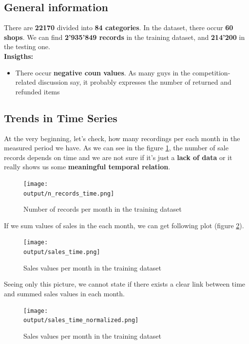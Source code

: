 \documentclass[12pt,twoside,a4paper]{memoir}
\def \output {../output}
\begin{document}
\subsection{General information}
There are  \textbf{22170} divided into \textbf{84 categories}. In the dataset, there occur \textbf{60 shops}. We can find \textbf{2'935'849 records} in the training dataset, and \textbf{214'200} in the testing one.
\newline \\
\textbf{Insigths:}
\begin{itemize}
\item There occur \textbf{negative coun values}. As many guys in the competition-related discussion say, it probably expresses the number of returned and refunded items
\end{itemize}

\subsection{Trends in Time Series}

At the very beginning, let's check, how many recordings per each month in the measured period we have. As we can see in the figure \ref{fig:nRecords}, the number of sale records depends on time and we are not sure if it's just a \textbf{lack of data} or it really shows us some \textbf{meaningful temporal relation}.

	\begin{figure}[ht]
		\centering
		\texttt{[image: \\output/n\_records\_time.png]}
		\caption{Number of records per month in the training dataset}
	\label{fig:nRecords}
	\end{figure}

If we sum values of sales in the each month, we can get following plot (figure \ref{fig:salesValues}).

	\begin{figure}[H]
		\centering
		\texttt{[image: \\output/sales\_time.png]}
		\caption{Sales values per month in the training dataset}
	\label{fig:salesValues}
	\end{figure}
Seeing only this picture, we cannot state if there exists a clear link between time and summed sales values in each month. 

	\begin{figure}[H]
		\centering
		\texttt{[image: \\output/sales\_time\_normalized.png]}
		\caption{Sales values per month in the training dataset}
	\label{fig:salesRecordsValues}
	\end{figure}
\end{document}

